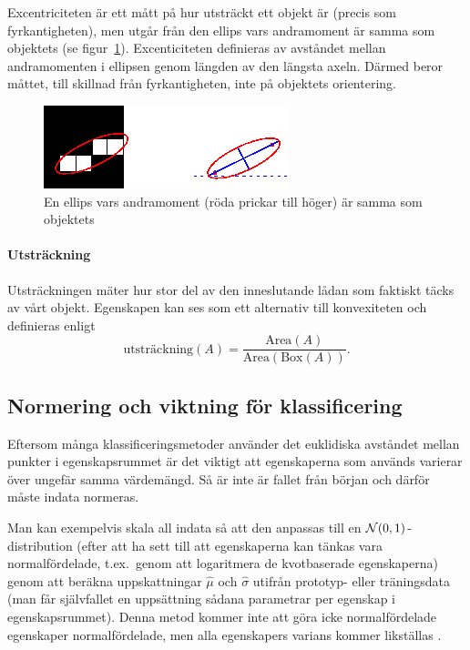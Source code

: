 \documentclass[../rapport_MVEX01-11-05]{subfiles}
\begin{document}
Excentriciteten är ett mått på hur utsträckt ett objekt är (precis som
fyrkantigheten), men utgår från den ellips
vars andramoment är samma som
objektets (se figur~\ref{fig:ellips}). Excenticiteten definieras av avståndet
mellan andramomenten i ellipsen genom längden av den längsta axeln. Därmed
beror måttet, till skillnad från fyrkantigheten, inte på objektets orientering.

\begin{figure}[tb]
	\centering 
	\includegraphics{bilder/matlab-ellips.png}
	\caption{En ellips vars andramoment (röda prickar till höger) är samma
	som objektets}
	\label{fig:ellips}
\end{figure}

\paragraph{Utsträckning}

Utsträckningen mäter hur stor del av den inneslutande lådan som
faktiskt täcks av vårt objekt. Egenskapen kan ses som ett alternativ
till konvexiteten och definieras enligt
\begin{equation*}
  \textrm{utsträckning}(A) =
  \frac{\textrm{Area}(A)}{\textrm{Area}(\textrm{Box}(A))}.
\end{equation*}

\subsection{Normering och viktning för klassificering}

Eftersom många klassificeringsmetoder använder det euklidiska avståndet mellan punkter i 
egenskapsrummet är det viktigt att egenskaperna som används varierar över
ungefär samma värdemängd. Så är inte är fallet från början och därför måste indata
normeras.

Man kan exempelvis skala all indata så att den anpassas till en 
$\mathcal{N}(0,1)$-distribution (efter att ha sett till att egenskaperna kan tänkas 
vara normalfördelade, t.ex.~genom att logaritmera de kvotbaserade 
egenskaperna) genom att beräkna uppskattningar $\hat\mu$ och $\hat\sigma$
utifrån prototyp- eller träningsdata (man får självfallet en uppsättning sådana
parametrar per egenskap i egenskapsrummet). Denna metod kommer inte
att göra icke normalfördelade egenskaper normalfördelade, men alla
egenskapers varians kommer likställas \cite{Aksoy01}.
\end{document}
